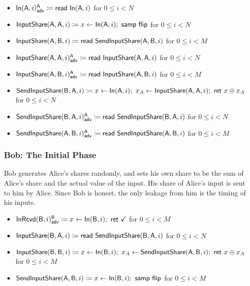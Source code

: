 \begin{itemize}
\item {\color{blue} $\mathsf{In}(\mathsf{A},i)^{\mathsf{A}}_{\mathsf{adv}} \coloneqq \mathsf{read} \ \mathsf{In}(\mathsf{A},i)$ for $0 \leq i < N$}
\item $\mathsf{InputShare}(\mathsf{A},\mathsf{A},i) \coloneqq x \leftarrow \mathsf{In}(\mathsf{A},i); \ \mathsf{samp} \ \mathsf{flip}$ for $0 \leq i < N$
\item $\mathsf{InputShare}(\mathsf{A},\mathsf{B},i) \coloneqq \mathsf{read} \ \mathsf{SendInputShare}(\mathsf{A},\mathsf{B},i)$ for $0 \leq i < M$
\item {\color{blue} $\mathsf{InputShare}(\mathsf{A},\mathsf{A},i)^{\mathsf{A}}_{\mathsf{adv}} \coloneqq \mathsf{read} \ \mathsf{InputShare}(\mathsf{A},\mathsf{A},i)$ for $0 \leq i < N$}
\item {\color{blue} $\mathsf{InputShare}(\mathsf{A},\mathsf{B},i)^{\mathsf{A}}_{\mathsf{adv}} \coloneqq \mathsf{read} \ \mathsf{InputShare}(\mathsf{A},\mathsf{B},i)$ for $0 \leq i < M$}
\item $\mathsf{SendInputShare}(\mathsf{B},\mathsf{A},i) \coloneqq x \leftarrow \mathsf{In}(\mathsf{A},i); \ x_A \leftarrow \mathsf{InputShare}(\mathsf{A},\mathsf{A},i); \ \mathsf{ret} \ x \oplus x_A$ for $0 \leq i < N$
\item {\color{blue} $\mathsf{SendInputShare}(\mathsf{B},\mathsf{A},i)^{\mathsf{A}}_{\mathsf{adv}} \coloneqq \mathsf{read} \ \mathsf{SendInputShare}(\mathsf{B},\mathsf{A},i)$ for $0 \leq i < N$}
\item {\color{blue} $\mathsf{SendInputShare}(\mathsf{A},\mathsf{B},i)^{\mathsf{A}}_{\mathsf{adv}} \coloneqq \mathsf{read} \ \mathsf{SendInputShare}(\mathsf{A},\mathsf{B},i)$ for $0 \leq i < M$}
\end{itemize}

\subsubsection{Bob: The Initial Phase}
Bob generates Alice's shares randomly, and sets his own share to be the sum of Alice's share and the actual value of the input. His share of Alice's input is sent to him by Alice. Since Bob is honest, the only leakage from him is the timing of his inputs.

\begin{itemize}
\item {\color{blue} $\mathsf{InRcvd}(\mathsf{B},i)^{\mathsf{B}}_{\mathsf{adv}} \coloneqq x \leftarrow \mathsf{In}(\mathsf{B},i); \ \mathsf{ret} \ \checkmark$ for $0 \leq i < M$}
\item $\mathsf{InputShare}(\mathsf{B},\mathsf{A},i) \coloneqq \mathsf{read} \ \mathsf{SendInputShare}(\mathsf{B},\mathsf{A},i)$ for $0 \leq i < N$
\item $\InputShare(\B,\B,i) \coloneqq x \leftarrow \In(\B,i); \ x_A \leftarrow \SendInputShare(\A,\B,i); \ \ret{x \oplus x_A}$ for $0 \leq i < M$
\item $\mathsf{SendInputShare}(\mathsf{A},\mathsf{B},i) \coloneqq x \leftarrow \mathsf{In}(\mathsf{B},i); \ \mathsf{samp} \ \mathsf{flip}$ for $0 \leq i < M$
\end{itemize}


